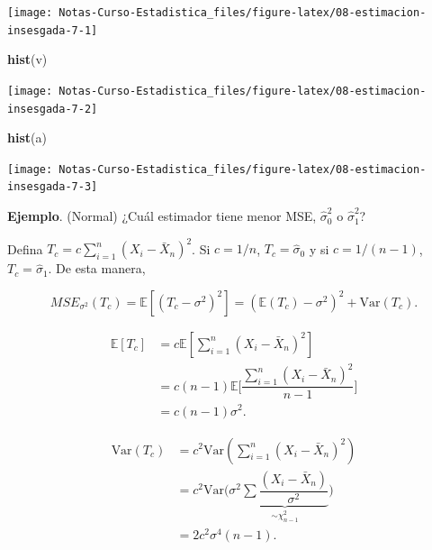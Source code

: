 \documentclass[
  12pt,
]{book}
\newenvironment{Shaded}{\begin{snugshade}}{\end{snugshade}}
\newcommand{\KeywordTok}[1]{\textcolor[rgb]{0.13,0.29,0.53}{\textbf{#1}}}
\newcommand{\NormalTok}[1]{#1}
\begin{document}
\begin{center}\texttt{[image: Notas-Curso-Estadistica\_files/figure-latex/08-estimacion-insesgada-7-1]} \end{center}

\begin{Shaded}
\begin{Highlighting}[]
\KeywordTok{hist}\NormalTok{(v)}
\end{Highlighting}
\end{Shaded}

\begin{center}\texttt{[image: Notas-Curso-Estadistica\_files/figure-latex/08-estimacion-insesgada-7-2]} \end{center}

\begin{Shaded}
\begin{Highlighting}[]
\KeywordTok{hist}\NormalTok{(a)}
\end{Highlighting}
\end{Shaded}

\begin{center}\texttt{[image: Notas-Curso-Estadistica\_files/figure-latex/08-estimacion-insesgada-7-3]} \end{center}

\textbf{Ejemplo}. (Normal) ¿Cuál estimador tiene menor MSE, \(\hat\sigma^2_0\) o \(\hat\sigma^2_1\)?

Defina \(T_c = c\sum_{i=1}^{n}\left(X_{i}-\bar{X}_{n}\right)^{2}\). Si \(c = 1/n\), \(T_c = \hat\sigma_0\) y si \(c = 1/(n-1)\), \(T_c = \hat\sigma_1\). De esta manera,

\[MSE_{\sigma^2}(T_c) = \mathbb E[(T_c-\sigma^2)^2] =(\mathbb E(T_c)-\sigma^2)^2+\text{Var}(T_c).\]

\begin{align*}
  \mathbb E[T_c]
  &= c\mathbb E[\sum_{i=1}^{n}\left(X_{i}-\bar{X}_{n}\right)^{2}] \\
  &= c(n-1)\mathbb E\bigg[\dfrac{\sum_{i=1}^{n}\left(X_{i}-\bar{X}_{n}\right)^{2}}{n-1}\bigg] \\
  &= c(n-1)\sigma^2.
\end{align*}

\begin{align*}
  \text{Var}(T_c)
  &= c^2\text{Var}(\sum_{i=1}^{n}\left(X_{i}-\bar{X}_{n}\right)^{2}) \\
  &= c^2\text{Var}\Bigg(\sigma^2\underbrace{\sum\dfrac{(X_i-\bar X_n)}{\sigma^2}}_{\sim\chi^2_{n-1}}\Bigg) \\
  &= 2c^2\sigma^4(n-1).
\end{align*}
\end{document}
